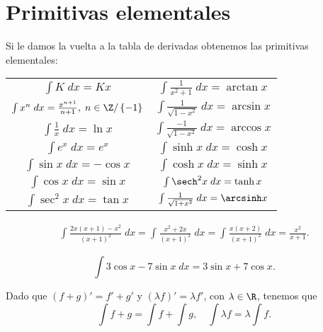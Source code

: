 \section{Primitivas elementales}
Si le damos la vuelta a la tabla de derivadas obtenemos las primitivas elementales:
\begin{center}
\begin{tabular}{|cc|}
	\hline
$ \int K  \; dx = Kx $ & $ \int \frac{1}{x^{2}+1} \; dx = \arctan x $ \\
$ \int x^{n} \; dx = \frac{x^{n+1}}{n + 1}, \; n \in \Z / \left\{ -1\right\}  $ & $ \int \frac{1}{\sqrt{1-x^{2}}} \; dx = \arcsin x $ \\
$ \int \frac{1}{x} \; dx = \ln x $ & $ \int \frac{-1}{\sqrt{1-x^{2}}} \; dx = \arccos x $ \\
$ \int e^{x} \; dx = e^{x} $ & $ \int \sinh x \; dx = \cosh x $ \\
$ \int \sin x \; dx = - \cos x $ & $ \int \cosh x \; dx = \sinh x $ \\
$ \int \cos x \; dx = \sin x $ & $\int \sech^{2}x \; dx = \tanh x $ \\
$ \int \sec^{2}x \; dx = \tan x $ & $ \int \frac{1}{\sqrt{1 + x^{2}}} \; dx = \arcsinh x $ \\
\hline
\end{tabular}
\end{center}
\begin{eg}
\normalfont 
\[
\begin{split}
\int^{}_{} \frac{2x\left(x+1\right)-x^{2}}{\left(x+1\right)^{2}} \; dx = \int^{}_{} \frac{x^{2}+2x}{\left(x+1\right)^{2}} \; dx = \int^{}_{} \frac{x\left(x+2\right)}{\left(x+1\right)^{2}} \; dx = \frac{x^{2}}{x + 1}.
\end{split}
\]
\end{eg}
\begin{eg}
\normalfont 
\[\int 3\cos x - 7 \sin x \; dx = 3 \sin x + 7 \cos x .\]
\end{eg}
\begin{observation}
\normalfont Dado que $\displaystyle \left(f+g\right)' = f' + g' $ y $\displaystyle \left(\lambda f\right)' = \lambda f' $, con $\displaystyle \lambda \in \R $, tenemos que 
\[ \int f + g = \int f + \int g , \quad \int \lambda f = \lambda \int f .\]
\end{observation}

